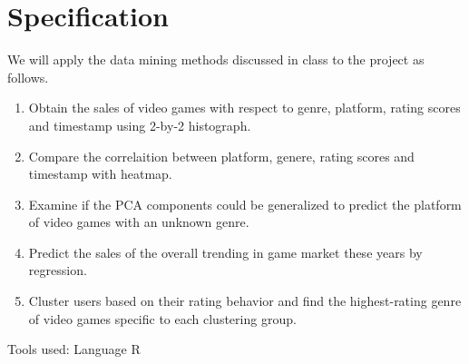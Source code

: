 \documentclass[10pt,a4paper]{article}
\begin{document}
	\section*{Specification}
    We will apply the data mining methods discussed in class to the project as follows.
		\begin{enumerate}
		\item Obtain the sales of video games with respect to genre, platform, rating scores and timestamp using 2-by-2 histograph.
		\item Compare the correlaition between platform, genere, rating scores and timestamp with heatmap.
		\item Examine if the PCA components could be generalized to predict the platform of video games with an unknown genre.
		\item Predict the sales of the overall trending in game market these years by regression.
		\item Cluster users based on their rating behavior and find the highest-rating genre of video games specific to each clustering group.
		\end{enumerate}
		Tools used: Language R

	\section*{}
\end{document}
